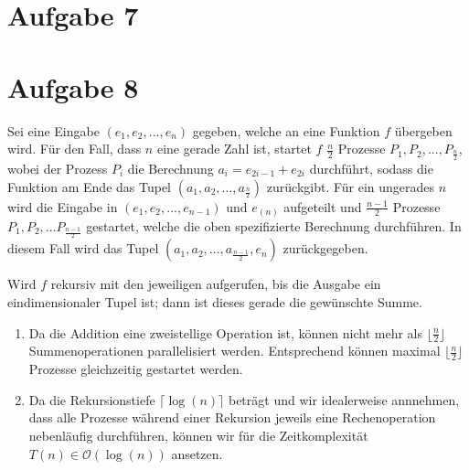 \documentclass[numbers=noendperiod]{scrartcl}
\begin{document}
\section*{Aufgabe 7}



\section*{Aufgabe 8}

Sei eine Eingabe $(e_1,e_2,...,e_n)$ gegeben, welche an eine Funktion $f$ übergeben wird. Für den Fall, dass $n$ eine gerade Zahl ist, startet $f$ $\frac{n}{2}$ Prozesse $P_1, P_2, ... , P_\frac{n}{2}$, wobei der Prozess $P_i$ die Berechnung $a_i = e_{2i-1} + e_{2i}$ durchführt, sodass die Funktion am Ende das Tupel $(a_1,a_2,...,a_\frac{n}{2})$ zurückgibt. Für ein ungerades $n$ wird die Eingabe in $(e_1,e_2,...,e_{n-1})$ und $e_(n)$ aufgeteilt und $\frac{n-1}{2}$ Prozesse $P_1, P_2, ... P_\frac{n-1}{2}$ gestartet, welche die oben spezifizierte Berechnung durchführen. In diesem Fall wird das Tupel $(a_1,a_2,...,a_\frac{n-1}{2},e_n)$ zurückgegeben.

Wird $f$ rekursiv mit den jeweiligen aufgerufen, bis die Ausgabe ein eindimensionaler Tupel ist; dann ist dieses gerade die gewünschte Summe.

\begin{enumerate}
	\item Da die Addition eine zweistellige Operation ist, können nicht mehr als $\lfloor \frac{n}{2} \rfloor$ Summenoperationen parallelisiert werden. Entsprechend können maximal $\lfloor \frac{n}{2} \rfloor$ Prozesse gleichzeitig gestartet werden.
	\item Da die Rekursionstiefe $\lceil \log(n) \rceil$ beträgt und wir idealerweise annnehmen, dass alle Prozesse während einer Rekursion jeweils eine Rechenoperation nebenläufig durchführen, können wir für die Zeitkomplexität $T(n) \in \mathcal{O}(\log(n))$ ansetzen.
\end{enumerate}
\end{document}
